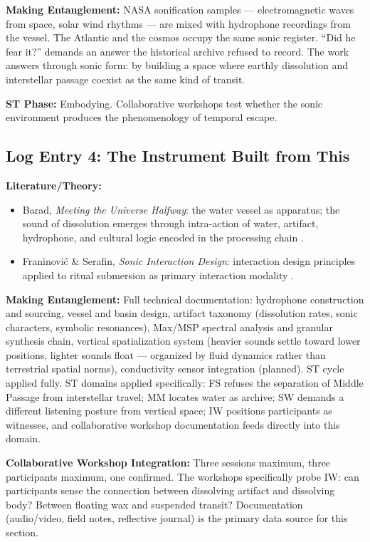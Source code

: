 \noindent\textbf{Making Entanglement:} NASA sonification samples — electromagnetic waves from space, solar wind rhythms — are mixed with hydrophone recordings from the vessel. The Atlantic and the cosmos occupy the same sonic register. ``Did he fear it?'' demands an answer the historical archive refused to record. The work answers through sonic form: by building a space where earthly dissolution and interstellar passage coexist as the same kind of transit.

\noindent\textbf{ST Phase:} Embodying. Collaborative workshops test whether the sonic environment produces the phenomenology of temporal escape.

\medskip

\subsection*{Log Entry 4: The Instrument Built from This}

\noindent\textbf{Literature/Theory:}
\begin{itemize}[noitemsep]
    \item Barad, \textit{Meeting the Universe Halfway}: the water vessel as apparatus; the sound of dissolution emerges through intra-action of water, artifact, hydrophone, and cultural logic encoded in the processing chain \parencite{Barad_2007}.
    \item Franinović \& Serafin, \textit{Sonic Interaction Design}: interaction design principles applied to ritual submersion as primary interaction modality \parencite{Franinovic_Serafin_2013}.
\end{itemize}

\noindent\textbf{Making Entanglement:} Full technical documentation: hydrophone construction and sourcing, vessel and basin design, artifact taxonomy (dissolution rates, sonic characters, symbolic resonances), Max/MSP spectral analysis and granular synthesis chain, vertical spatialization system (heavier sounds settle toward lower positions, lighter sounds float — organized by fluid dynamics rather than terrestrial spatial norms), conductivity sensor integration (planned). ST cycle applied fully. ST domains applied specifically: FS refuses the separation of Middle Passage from interstellar travel; MM locates water as archive; SW demands a different listening posture from vertical space; IW positions participants as witnesses, and collaborative workshop documentation feeds directly into this domain.

\noindent\textbf{Collaborative Workshop Integration:} Three sessions maximum, three participants maximum, one confirmed. The workshops specifically probe IW: can participants sense the connection between dissolving artifact and dissolving body? Between floating wax and suspended transit? Documentation (audio/video, field notes, reflective journal) is the primary data source for this section.

